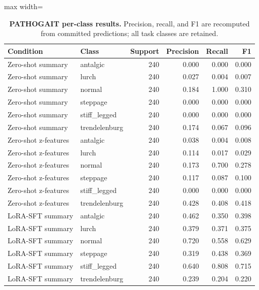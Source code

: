 \begin{table}[H]
\centering
\caption{\textbf{PATHOGAIT per-class results.} Precision, recall, and F1 are recomputed from committed predictions; all task classes are retained.}
\label{tab:per_class_pathogait}
\small
\begin{adjustbox}{max width=\textwidth}
\begin{tabular}{llrrrr}
\toprule
Condition & Class & Support & Precision & Recall & F1 \\
\midrule
Zero-shot summary & antalgic & 240 & 0.000 & 0.000 & 0.000 \\
Zero-shot summary & lurch & 240 & 0.027 & 0.004 & 0.007 \\
Zero-shot summary & normal & 240 & 0.184 & 1.000 & 0.310 \\
Zero-shot summary & steppage & 240 & 0.000 & 0.000 & 0.000 \\
Zero-shot summary & stiff\_legged & 240 & 0.000 & 0.000 & 0.000 \\
Zero-shot summary & trendelenburg & 240 & 0.174 & 0.067 & 0.096 \\
Zero-shot z-features & antalgic & 240 & 0.038 & 0.004 & 0.008 \\
Zero-shot z-features & lurch & 240 & 0.114 & 0.017 & 0.029 \\
Zero-shot z-features & normal & 240 & 0.173 & 0.700 & 0.278 \\
Zero-shot z-features & steppage & 240 & 0.117 & 0.087 & 0.100 \\
Zero-shot z-features & stiff\_legged & 240 & 0.000 & 0.000 & 0.000 \\
Zero-shot z-features & trendelenburg & 240 & 0.428 & 0.408 & 0.418 \\
LoRA-SFT summary & antalgic & 240 & 0.462 & 0.350 & 0.398 \\
LoRA-SFT summary & lurch & 240 & 0.379 & 0.371 & 0.375 \\
LoRA-SFT summary & normal & 240 & 0.720 & 0.558 & 0.629 \\
LoRA-SFT summary & steppage & 240 & 0.319 & 0.438 & 0.369 \\
LoRA-SFT summary & stiff\_legged & 240 & 0.640 & 0.808 & 0.715 \\
LoRA-SFT summary & trendelenburg & 240 & 0.239 & 0.204 & 0.220 \\
\bottomrule
\end{tabular}
\end{adjustbox}
\end{table}
